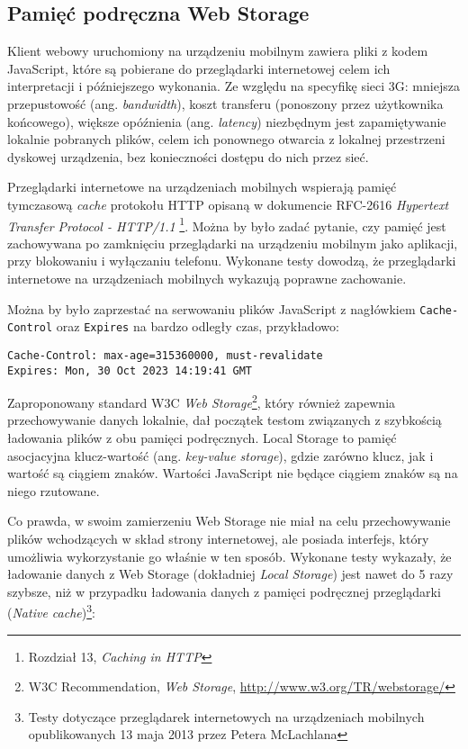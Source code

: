 \subsection{Pamięć podręczna Web Storage}

Klient webowy uruchomiony na urządzeniu mobilnym zawiera pliki z kodem JavaScript, które są pobierane do przeglądarki internetowej celem ich interpretacji i późniejszego wykonania. Ze względu na specyfikę sieci 3G: mniejsza przepustowość (ang. \emph{bandwidth}), koszt transferu (ponoszony przez użytkownika końcowego), większe opóźnienia (ang. \emph{latency}) niezbędnym jest zapamiętywanie lokalnie pobranych plików, celem ich ponownego otwarcia z lokalnej przestrzeni dyskowej urządzenia, bez konieczności dostępu do nich przez sieć.

Przeglądarki internetowe na urządzeniach mobilnych wspierają pamięć tymczasową \emph{cache} protokołu HTTP opisaną w dokumencie RFC-2616 \emph{Hypertext Transfer Protocol - HTTP/1.1}\cite{http-rfc} \footnote{Rozdział 13, \emph{Caching in HTTP}}. Można by było zadać pytanie, czy pamięć jest zachowywana po zamknięciu przeglądarki na urządzeniu mobilnym jako aplikacji, przy blokowaniu i wyłączaniu telefonu. Wykonane testy dowodzą, że przeglądarki internetowe na urządzeniach mobilnych wykazują poprawne zachowanie\cite{http-cache-mobile-benchmark}.

Można by było zaprzestać na serwowaniu plików JavaScript z nagłówkiem \lstinline{Cache-Control} oraz \lstinline{Expires} na bardzo odległy czas, przykładowo:

\lstset{language=Octave}
\begin{lstlisting}
Cache-Control: max-age=315360000, must-revalidate
Expires: Mon, 30 Oct 2023 14:19:41 GMT
\end{lstlisting}

Zaproponowany standard W3C \emph{Web Storage}\cite{webstorage}\footnote{W3C Recommendation, {\em Web Storage}, \url{http://www.w3.org/TR/webstorage/}}, który również zapewnia przechowywanie danych lokalnie, dał początek testom związanych z szybkością ładowania plików z obu pamięci podręcznych. Local Storage to pamięć asocjacyjna klucz-wartość (ang. \emph{key-value storage}), gdzie zarówno klucz, jak i wartość są ciągiem znaków. Wartości JavaScript nie będące ciągiem znaków są na niego rzutowane.

Co prawda, w swoim zamierzeniu Web Storage nie miał na celu przechowywanie plików wchodzących w skład strony internetowej, ale posiada interfejs, który umożliwia wykorzystanie go właśnie w ten sposób. Wykonane testy wykazały, że ładowanie danych z Web Storage (dokładniej \emph{Local Storage}) jest nawet do 5 razy szybsze, niż w przypadku ładowania danych z pamięci podręcznej przeglądarki (\emph{Native cache})\cite{http-cache-mobile-benchmark}\footnote{Testy dotyczące przeglądarek internetowych na urządzeniach mobilnych opublikowanych 13 maja 2013 przez Petera McLachlana}:

